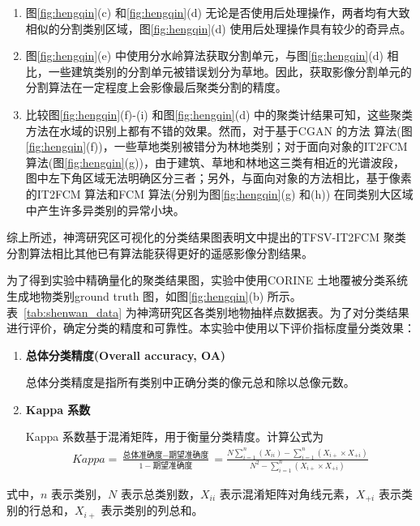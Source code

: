 \begin{enumerate}[(1)]
    \item 图\ref{fig:hengqin}(c) 和\ref{fig:hengqin}(d) 无论是否使用后处理操作，两者均有大致相似的分割类别区域，图\ref{fig:hengqin}(d) 使用后处理操作具有较少的奇异点。
    \item 图\ref{fig:hengqin}(e) 中使用分水岭算法获取分割单元，与图\ref{fig:hengqin}(d) 相比，一些建筑类别的分割单元被错误划分为草地。因此，获取影像分割单元的分割算法在一定程度上会影像最后聚类分割的精度。
    \item 比较图\ref{fig:hengqin}(f)-(i) 和图\ref{fig:hengqin}(d) 中的聚类计结果可知，这些聚类方法在水域的识别上都有不错的效果。然而，对于基于CGAN 的方法 算法(图\ref{fig:hengqin}(f))，一些草地类别被错分为林地类别；对于面向对象的IT2FCM 算法(图\ref{fig:hengqin}(g))，由于建筑、草地和林地这三类有相近的光谱波段，图中左下角区域无法明确区分三者；另外，与面向对象的方法相比，基于像素的IT2FCM 算法和FCM 算法(分别为图\ref{fig:hengqin}(g) 和(h)) 在同类别大区域中产生许多异类别的异常小块。
\end{enumerate}
综上所述，神湾研究区可视化的分类结果图表明文中提出的TFSV-IT2FCM 聚类分割算法相比其他已有算法能获得更好的遥感影像分割结果。


为了得到实验中精确量化的聚类结果图，实验中使用CORINE 土地覆被分类系统生成地物类别ground truth 图，如图\ref{fig:hengqin}(b) 所示。表~\ref{tab:shenwan_data} 为神湾研究区各类别地物抽样点数据表。为了对分类结果进行评价，确定分类的精度和可靠性。本实验中使用以下评价指标度量分类效果：
\begin{enumerate}
    \item \textbf{总体分类精度(Overall accuracy, OA)}

          总体分类精度是指所有类别中正确分类的像元总和除以总像元数。
    \item \textbf{Kappa 系数}

          Kappa 系数基于混淆矩阵，用于衡量分类精度。计算公式为
          \begin{equation}\label{eq:kappa}
              \begin{split}
                  Kappa = \frac{\mbox{总体准确度}-\mbox{期望准确度}}{1-\mbox{期望准确度}} = \frac{N\sum_{i=1}^n(X_{ii}) - \sum_{i=1}^n(X_{i+} \times X_{+i})}{N^2 - \sum_{i=1}^n(X_{i+} \times X_{+i})}
              \end{split}
          \end{equation}
\end{enumerate}
式中，$n$ 表示类别，$N$ 表示总类别数，$X_{ii}$ 表示混淆矩阵对角线元素，$X_{+i}$ 表示类别的行总和，$X_{i+}$ 表示类别的列总和。



